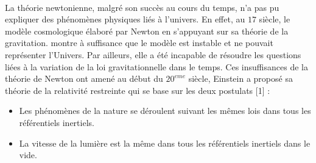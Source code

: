 \documentclass[a4paper,12pt]{report}
\theoremstyle{plain}
\theoremstyle{plain}
\begin{document}
%

\paragraph{}
La théorie newtonienne, malgré son succès au cours du temps, n'a pas pu expliquer des phénomènes physiques liés à l'univers. En effet, au $17$ siècle, le modèle cosmologique élaboré par  Newton en s’appuyant sur sa théorie de la gravitation.
montre à suffisance que le modèle est instable et ne pouvait représenter l’Univers.  Par ailleurs, elle a été incapable de résoudre les questions liées à la variation de la loi gravitationnelle dans le temps. Ces insuffisances de la théorie de Newton ont amené au début du $20^{eme}$ siècle, Einstein a proposé sa théorie de la relativité restreinte qui se base sur les deux postulats [1] :	\begin{itemize}
	\item   Les phénomènes de la nature se déroulent suivant les mêmes lois dans tous les référentiels inertiels.
	\item  La vitesse de la lumière est la même dans tous les référentiels inertiels dans le vide.
	
\end{itemize}
%	
\end{document}
